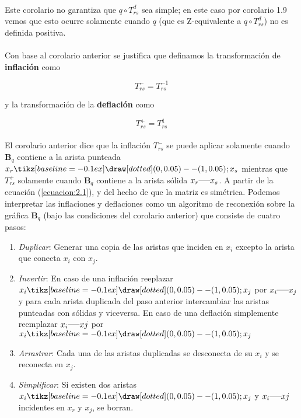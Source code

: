 \paragraph{}
Este corolario no garantiza que $q \circ T_{rs}^{d}$ sea simple; en este caso por corolario 1.9 vemos que esto ocurre solamente cuando $q$ (que es $\mathrm{Z}$-equivalente a $q \circ T_{rs}^{d}$) no es definida positiva.

\paragraph{}
Con base al corolario anterior se justifica que definamos la transformación de \textbf{inflación} como

\begin{equation*}
    T_{rs}^{-} = T_{rs}^{-1}
\end{equation*}

y la transformación de la \textbf{deflación} como

\begin{equation*}
    T_{rs}^{+} = T_{rs}^{1}
\end{equation*}

\paragraph{}
El corolario anterior dice que la inflación $T_{rs}^{-}$ se puede aplicar solamente cuando $\textbf{B}_{q}$ contiene a la arista punteada $x_{r} \tikz[baseline=-0.1ex]\draw [dotted] (0,0.05) -- (1,0.05); x_{s}$ mientras que $T_{rs}^{+}$ solamente cuando $\textbf{B}_{q}$ contiene a la arista sólida $x_{r}  \rule[1mm]{5mm}{0.1mm} x_{s}$. A partir de la ecuación (\ref{ecuacion:2.1}), y del hecho de que la matriz es simétrica. Podemos interpretar las inflaciones y deflaciones como un algoritmo de reconexión sobre la gráfica $\textbf{B}_{q}$ (bajo las condiciones del corolario anterior) que consiste de cuatro pasos:

\begin{enumerate}
    \item \textit{Duplicar}: Generar una copia de las aristas que inciden en $x_{i}$ excepto la arista que conecta $x_{i}$ con $x_{j}$.
    \item \textit{Invertir}: En caso de una inflación reeplazar $x_{i} \tikz[baseline=-0.1ex]\draw [dotted] (0,0.05) -- (1,0.05); x_{j}$ por $x_{i} \rule[1mm]{5mm}{0.1mm} x_{j}$ y para cada arista duplicada del paso anterior intercambiar las aristas punteadas con sólidas y viceversa. En caso de una deflación simplemente reemplazar $x_{i} \rule[1mm]{5mm}{0.1mm} x{j}$ por $x_{i} \tikz[baseline=-0.1ex]\draw [dotted] (0,0.05) -- (1,0.05); x_{j}$
    \item \textit{Arrastrar}: Cada una de las aristas duplicadas se desconecta de su $x_{i}$ y se reconecta en $x_{j}$.
    \item \textit{Simplificar}: Si existen dos aristas $x_{i} \tikz[baseline=-0.1ex]\draw [dotted] (0,0.05) -- (1,0.05); x_{j}$ y $x_{i} \rule[1mm]{5mm}{0.1mm} x{j}$ incidentes en $x_{r}$ y $x_{j}$,  se borran.
\end{enumerate}

